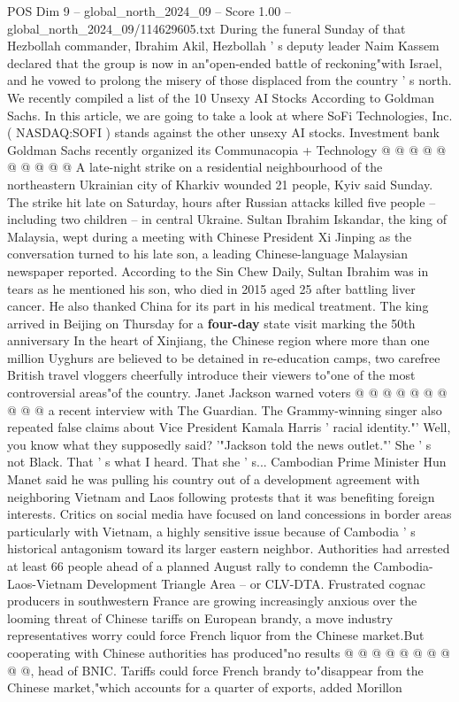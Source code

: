 \begin{textsample}{POS Dim 9 – global\_north\_2024\_09 – Score 1.00 – global\_north\_2024\_09/114629605.txt}
During the funeral Sunday of that Hezbollah commander, Ibrahim Akil, Hezbollah ' s deputy leader Naim Kassem declared that the group is now in an"open-ended battle of reckoning"with Israel, and he vowed to prolong the misery of those displaced from the country ' s north.
We recently compiled a list of the 10 Unsexy AI Stocks According to Goldman Sachs.
In this article, we are going to take a look at where SoFi Technologies, Inc. ( NASDAQ:SOFI ) stands against the other unsexy AI stocks.
Investment bank Goldman Sachs recently organized its Communacopia + Technology @ @ @ @ @ @ @ @ @ @ A late-night strike on a residential neighbourhood of the northeastern Ukrainian city of Kharkiv wounded 21 people, Kyiv said Sunday.
The strike hit late on Saturday, hours after Russian attacks killed five people -- including two children -- in central Ukraine.
Sultan Ibrahim Iskandar, the king of Malaysia, wept during a meeting with Chinese President Xi Jinping as the conversation turned to his late son, a leading Chinese-language Malaysian newspaper reported.
According to the Sin Chew Daily, Sultan Ibrahim was in tears as he mentioned his son, who died in 2015 aged 25 after battling liver cancer.
He also thanked China for its part in his medical treatment.
The king arrived in Beijing on Thursday for a \textbf{four-day} state visit marking the 50th anniversary In the heart of Xinjiang, the Chinese region where more than one million Uyghurs are believed to be detained in re-education camps, two carefree British travel vloggers cheerfully introduce their viewers to"one of the most controversial areas"of the country.
Janet Jackson warned voters @ @ @ @ @ @ @ @ @ @ a recent interview with The Guardian.
The Grammy-winning singer also repeated false claims about Vice President Kamala Harris ' racial identity."' Well, you know what they supposedly said? '"Jackson told the news outlet."' She ' s not Black.
That ' s what I heard.
That she ' s...
Cambodian Prime Minister Hun Manet said he was pulling his country out of a development agreement with neighboring Vietnam and Laos following protests that it was benefiting foreign interests.
Critics on social media have focused on land concessions in border areas particularly with Vietnam, a highly sensitive issue because of Cambodia ' s historical antagonism toward its larger eastern neighbor.
Authorities had arrested at least 66 people ahead of a planned August rally to condemn the Cambodia-Laos-Vietnam Development Triangle Area -- or CLV-DTA.
Frustrated cognac producers in southwestern France are growing increasingly anxious over the looming threat of Chinese tariffs on European brandy, a move industry representatives worry could force French liquor from the Chinese market.But cooperating with Chinese authorities has produced"no results @ @ @ @ @ @ @ @ @ @, head of BNIC.
Tariffs could force French brandy to"disappear from the Chinese market,"which accounts for a quarter of exports, added Morillon

\end{textsample}
